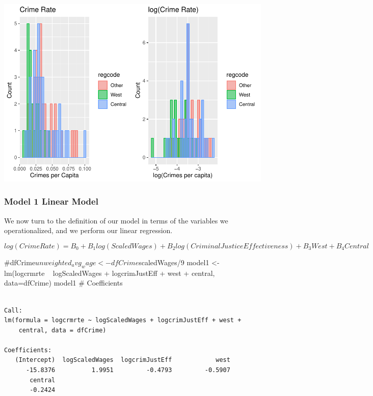 \documentclass[]{article}
\newenvironment{Shaded}{}{}
\newcommand{\CommentTok}[1]{\textcolor[rgb]{0.00,0.50,0.00}{#1}}
\newcommand{\DataTypeTok}[1]{#1}
\newcommand{\KeywordTok}[1]{\textcolor[rgb]{0.00,0.00,1.00}{#1}}
\newcommand{\NormalTok}[1]{#1}
\newcommand{\OperatorTok}[1]{#1}
\newcommand{\StringTok}[1]{\textcolor[rgb]{0.00,0.50,0.50}{#1}}
\begin{document}
\includegraphics{Bagnard_Gaustad_Hartman_Leung_Lab_3_files/figure-latex/unnamed-chunk-57-1.pdf}

\hypertarget{model-1-linear-model}{%
\subsubsection{Model 1 Linear Model}\label{model-1-linear-model}}

We now turn to the definition of our model in terms of the variables we
operationalized, and we perform our linear regression.

\[ log(Crime Rate) = B_0 + B_1log(Scaled Wages) + B_2log(Criminal Justice Effectiveness) + B_3West + B_4Central\]

\begin{Shaded}
\begin{Highlighting}[]
\CommentTok{#dfCrime$unweighted_avg_wage <- dfCrime$scaledWages/9}
\NormalTok{model1 <-}\StringTok{ }\KeywordTok{lm}\NormalTok{(logcrmrte }\OperatorTok{~}\StringTok{ }\NormalTok{logScaledWages }\OperatorTok{+}\StringTok{ }\NormalTok{logcrimJustEff }\OperatorTok{+}\StringTok{ }\NormalTok{west }\OperatorTok{+}\StringTok{ }\NormalTok{central, }\DataTypeTok{data=}\NormalTok{dfCrime)}
\NormalTok{model1 }\CommentTok{# Coefficients}
\end{Highlighting}
\end{Shaded}

\begin{verbatim}

Call:
lm(formula = logcrmrte ~ logScaledWages + logcrimJustEff + west + 
    central, data = dfCrime)

Coefficients:
   (Intercept)  logScaledWages  logcrimJustEff            west  
      -15.8376          1.9951         -0.4793         -0.5907  
       central  
       -0.2424  
\end{verbatim}
\end{document}
